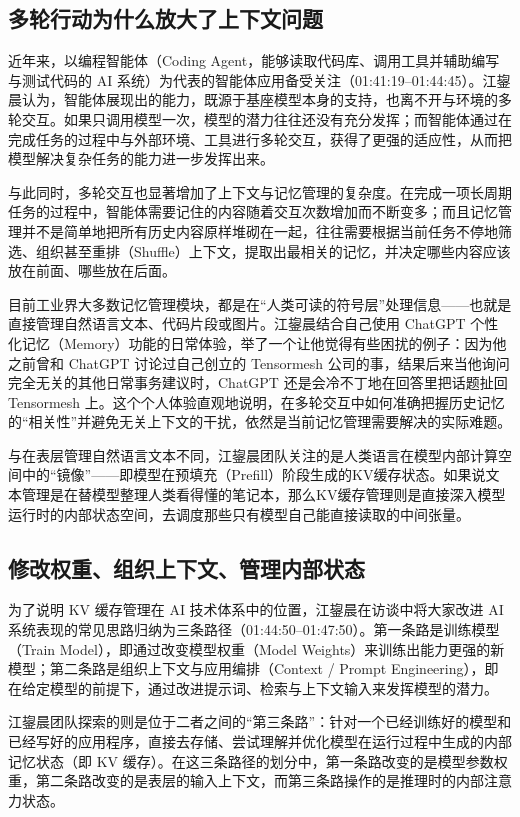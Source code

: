 \documentclass[UTF8,a4paper,11pt,fontset=fandol]{ctexart}
\begin{document}
\subsection{多轮行动为什么放大了上下文问题}
近年来，以编程智能体（Coding Agent，能够读取代码库、调用工具并辅助编写与测试代码的 AI 系统）为代表的智能体应用备受关注（01:41:19–01:44:45）。江鋆晨认为，智能体展现出的能力，既源于基座模型本身的支持，也离不开与环境的多轮交互。如果只调用模型一次，模型的潜力往往还没有充分发挥；而智能体通过在完成任务的过程中与外部环境、工具进行多轮交互，获得了更强的适应性，从而把模型解决复杂任务的能力进一步发挥出来。

与此同时，多轮交互也显著增加了上下文与记忆管理的复杂度。在完成一项长周期任务的过程中，智能体需要记住的内容随着交互次数增加而不断变多；而且记忆管理并不是简单地把所有历史内容原样堆砌在一起，往往需要根据当前任务不停地筛选、组织甚至重排（Shuffle）上下文，提取出最相关的记忆，并决定哪些内容应该放在前面、哪些放在后面。

目前工业界大多数记忆管理模块，都是在“人类可读的符号层”处理信息——也就是直接管理自然语言文本、代码片段或图片。江鋆晨结合自己使用 ChatGPT 个性化记忆（Memory）功能的日常体验，举了一个让他觉得有些困扰的例子：因为他之前曾和 ChatGPT 讨论过自己创立的 Tensormesh 公司的事，结果后来当他询问完全无关的其他日常事务建议时，ChatGPT 还是会冷不丁地在回答里把话题扯回 Tensormesh 上。这个个人体验直观地说明，在多轮交互中如何准确把握历史记忆的“相关性”并避免无关上下文的干扰，依然是当前记忆管理需要解决的实际难题。

与在表层管理自然语言文本不同，江鋆晨团队关注的是人类语言在模型内部计算空间中的“镜像”——即模型在预填充（Prefill）阶段生成的KV缓存状态。如果说文本管理是在替模型整理人类看得懂的笔记本，那么KV缓存管理则是直接深入模型运行时的内部状态空间，去调度那些只有模型自己能直接读取的中间张量。

\subsection{修改权重、组织上下文、管理内部状态}
为了说明 KV 缓存管理在 AI 技术体系中的位置，江鋆晨在访谈中将大家改进 AI 系统表现的常见思路归纳为三条路径（01:44:50–01:47:50）。第一条路是训练模型（Train Model），即通过改变模型权重（Model Weights）来训练出能力更强的新模型；第二条路是组织上下文与应用编排（Context / Prompt Engineering），即在给定模型的前提下，通过改进提示词、检索与上下文输入来发挥模型的潜力。

江鋆晨团队探索的则是位于二者之间的“第三条路”：针对一个已经训练好的模型和已经写好的应用程序，直接去存储、尝试理解并优化模型在运行过程中生成的内部记忆状态（即 KV 缓存）。在这三条路径的划分中，第一条路改变的是模型参数权重，第二条路改变的是表层的输入上下文，而第三条路操作的是推理时的内部注意力状态。
\end{document}
